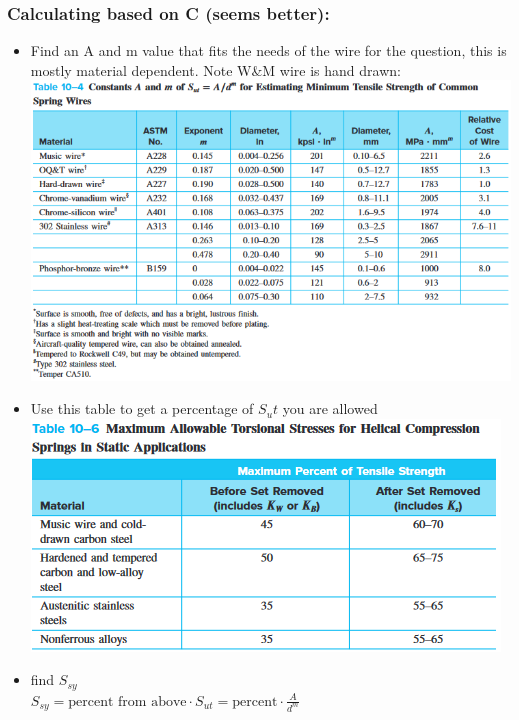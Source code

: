 \documentclass[11pt, fleqn]{article}
\begin{document}
\subsubsection{Calculating based on C (seems better):}
\begin{itemize}

    \item Find an A and m value that fits the needs of the wire for the question, this is mostly material dependent. Note W\&M wire is hand drawn:\\
    \includegraphics[scale=0.7]{Springs/Tab10-4.png}\\

    \item Use this table to get a percentage of $S_ut$ you are allowed\\
    \includegraphics[scale = 0.9]{Springs/Tab10-6.png}\\

    \item find $S_{sy}$\\
    $S_{sy} = \text{percent from above}\cdot S_{ut} = \text{percent}\cdot\frac{A}{d^m}$\\


\end{itemize}
\end{document}

